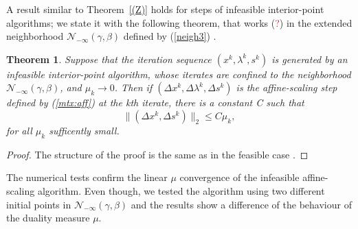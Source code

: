 \documentclass[a4paper,10 pt,titlepage,twoside]{book}
\theoremstyle{plain}
\newtheorem{thm}{Theorem}[chapter]
\theoremstyle{definition}
\theoremstyle{remark}
\begin{document}
A result similar to Theorem~\ref{(Z)} holds for steps of infeasible interior-point algorithms; we state it with the following theorem, that works (\textcolor{red}{?}) in the extended neighborhood $\mathcal{N}_{-\infty}(\gamma,\beta)$ defined by (\ref{neigh3}) \cite{Wright}.\\
\begin{thm}
	Suppose that the iteration sequence $(x^{k},\lambda^{k},s^{k})$ is generated by an infeasible interior-point algorithm, whose iterates are confined to the neighborhood $\mathcal{N}_{-\infty}(\gamma,\beta)$, and $\mu_{k}\to 0$. Then if $(\Delta x^{k},\Delta \lambda^{k},\Delta s^{k})$ is the affine-scaling step defined by (\ref{mtx:aff}) at the kth iterate, there is a constant C such that
	\begin{equation*}
		\lVert(\Delta x^{k},\Delta s^{k})\rVert_{2}\leq C\mu_{k},
	\end{equation*}
	for all $\mu_{k}$ sufficently small.
\end{thm}
\begin{proof}
	The structure of the proof is the same as in the feasible case \cite{Wright}.
\end{proof}
The numerical tests confirm the linear $\mu$ convergence of the infeasible affine-scaling algorithm. Even though, we tested the algorithm using two different initial points in $\mathcal{N}_{-\infty}(\gamma,\beta)$ and the results show a difference of the behaviour of the duality measure $\mu$.
\end{document}
